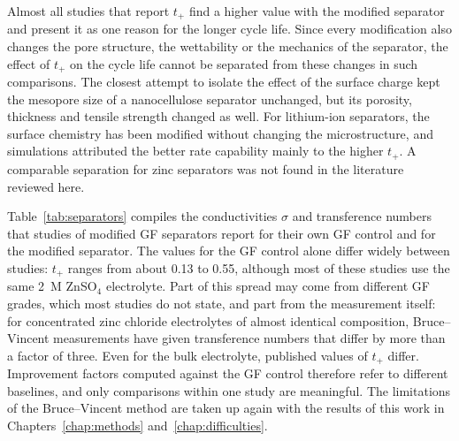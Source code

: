 Almost all studies that report $t_+$ find a higher value with the modified separator and present it as one reason for the longer cycle life\cite{luo_regulating_2024,yuan_synergistic_2025}.
Since every modification also changes the pore structure, the wettability or the mechanics of the separator, the effect of $t_+$ on the cycle life cannot be separated from these changes in such comparisons.
The closest attempt to isolate the effect of the surface charge kept the mesopore size of a nanocellulose separator unchanged, but its porosity, thickness and tensile strength changed as well\cite{zhang_cationic_2023}.
For lithium-ion separators, the surface chemistry has been modified without changing the microstructure, and simulations attributed the better rate capability mainly to the higher $t_+$\cite{zahn_improving_2016}.
A comparable separation for zinc separators was not found in the literature reviewed here.

Table~\ref{tab:separators} compiles the conductivities $\sigma$ and transference numbers that studies of modified GF separators report for their own GF control and for the modified separator.
The values for the GF control alone differ widely between studies: $t_+$ ranges from about 0.13 to 0.55, although most of these studies use the same \SI{2}{M} ZnSO$_4$ electrolyte.
Part of this spread may come from different GF grades, which most studies do not state, and part from the measurement itself: for concentrated zinc chloride electrolytes of almost identical composition, Bruce--Vincent measurements have given transference numbers that differ by more than a factor of three\cite{gomez_vazquez_measuring_2025}.
Even for the bulk electrolyte, published values of $t_+$ differ\cite{purser_transference_1951,cui_revealing_2025}.
Improvement factors computed against the GF control therefore refer to different baselines, and only comparisons within one study are meaningful.
The limitations of the Bruce--Vincent method are taken up again with the results of this work in Chapters~\ref{chap:methods} and~\ref{chap:difficulties}.

